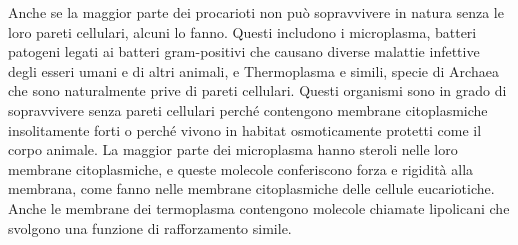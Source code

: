 Anche se la maggior parte dei procarioti non può sopravvivere in natura senza le loro pareti cellulari, alcuni lo fanno. Questi includono i microplasma, 
batteri patogeni legati ai batteri gram-positivi che causano diverse malattie infettive degli esseri umani e di altri animali, e Thermoplasma e simili, 
specie di Archaea che sono naturalmente prive di pareti cellulari. Questi organismi sono in grado di sopravvivere senza pareti cellulari perché contengono 
membrane citoplasmiche insolitamente forti o perché vivono in habitat osmoticamente protetti come il corpo animale. La maggior parte dei microplasma hanno 
steroli nelle loro membrane citoplasmiche, e queste molecole conferiscono forza e rigidità alla membrana, come fanno nelle membrane citoplasmiche delle 
cellule eucariotiche. Anche le membrane dei termoplasma contengono molecole chiamate lipolicani che svolgono una funzione di rafforzamento simile.
